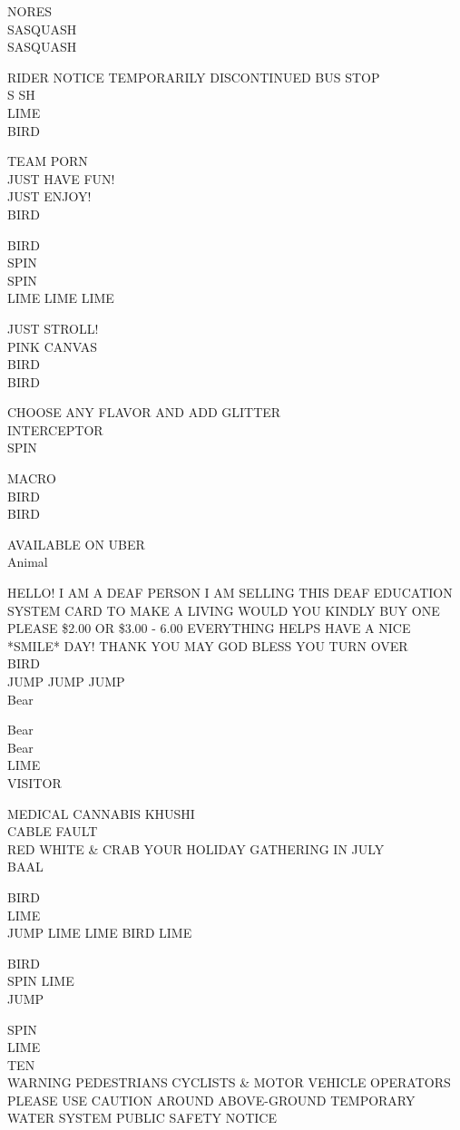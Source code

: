 \documentclass[10pt,letterpaper]{article}
\begin{document}
NORES\\
SASQUASH\\
SASQUASH

RIDER NOTICE TEMPORARILY DISCONTINUED BUS STOP\\
S SH\\
LIME\\
BIRD

TEAM PORN\\
JUST HAVE FUN!\\
JUST ENJOY!\\
BIRD

BIRD\\
SPIN\\
SPIN\\
LIME LIME LIME

JUST STROLL!\\
PINK CANVAS\\
BIRD\\
BIRD

CHOOSE ANY FLAVOR AND ADD GLITTER\\
INTERCEPTOR\\
SPIN

MACRO\\
BIRD\\
BIRD

AVAILABLE ON UBER\\
Animal

HELLO!  I AM A DEAF PERSON I AM SELLING THIS DEAF EDUCATION SYSTEM CARD TO MAKE A LIVING WOULD YOU KINDLY BUY ONE PLEASE \$2.00 OR \$3.00 {-} 6.00 EVERYTHING HELPS HAVE A NICE *SMILE* DAY!  THANK YOU MAY GOD BLESS YOU TURN OVER\\
BIRD\\
JUMP JUMP JUMP\\
Bear

Bear\\
Bear\\
LIME\\
VISITOR

MEDICAL CANNABIS KHUSHI\\
CABLE FAULT\\
RED WHITE \& CRAB YOUR HOLIDAY GATHERING IN JULY\\
BAAL

BIRD\\
LIME\\
JUMP LIME LIME BIRD LIME

BIRD\\
SPIN LIME\\
JUMP

SPIN\\
LIME\\
TEN\\
WARNING PEDESTRIANS CYCLISTS \& MOTOR VEHICLE OPERATORS PLEASE USE CAUTION AROUND ABOVE{-}GROUND TEMPORARY WATER SYSTEM PUBLIC SAFETY NOTICE
\end{document}
